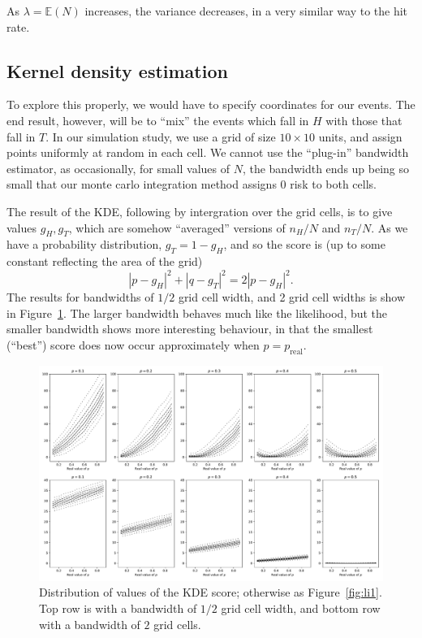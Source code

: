 \documentclass[twoside,a4paper,twocolumn,10pt]{article}
\theoremstyle{plain}
\theoremstyle{definition}
\begin{document}
As $\lambda = \mathbb E(N)$ increases, the variance decreases, in a very
similar way to the hit rate.



\subsection{Kernel density estimation}

To explore this properly, we would have to specify coordinates for our events.  The end result,
however, will be to ``mix'' the events which fall in $H$ with those that fall in $T$.
In our simulation study, we use a grid of size $10\times10$ units, and assign
points uniformly at random in each cell.  We cannot use the ``plug-in''
bandwidth estimator, as occasionally, for small values of $N$, the bandwidth
ends up being so small that our monte carlo integration method assigns 0 risk
to both cells.

The result of the KDE, following by intergration over the grid cells, is
to give values $g_H, g_T$, which are somehow ``averaged'' versions of
$n_H/N$ and $n_T/N$.  As we have a probability distribution, $g_T = 1 - g_H$,
and so the score is (up to some constant reflecting the area of the grid)
\[ |p-g_H|^2 + |q-g_T|^2 = 2|p-g_H|^2. \]
The results for bandwidths of $1/2$ grid cell width, and 2 grid cell widths
is show in Figure~\ref{fig:kde1}.  The larger bandwidth behaves much like
the likelihood, but the smaller bandwidth shows more interesting behaviour,
in that the smallest (``best'') score does now occur approximately when
$p = p_{\text{real}}$.

\begin{figure}
  \includegraphics[width=\textwidth]{../details/kde_toy.pdf}
  \caption{Distribution of values of the KDE score; otherwise as
  Figure~\ref{fig:li1}.  Top row is with a bandwidth of $1/2$ grid cell
  width, and bottom row with a bandwidth of $2$ grid cells.}
  \label{fig:kde1}
\end{figure}
\end{document}
